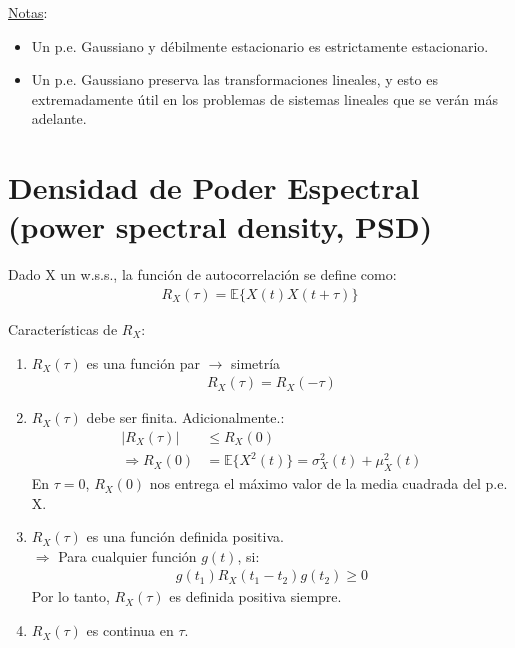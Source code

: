 \underline{Notas}:
\begin{itemize}
    \item Un p.e. Gaussiano y débilmente estacionario es estrictamente estacionario.
    \item Un p.e. Gaussiano preserva las transformaciones lineales, y esto es extremadamente útil en los problemas de sistemas lineales que se verán más adelante.
\end{itemize}





\section{Densidad de Poder Espectral (power spectral density, PSD)}
Dado X un w.s.s., la función de autocorrelación se define como:
\begin{align*}
    R_X(\tau)=\mathbb{E}\{X(t)X(t+\tau)\}
\end{align*}

Características de $R_X$:
\begin{enumerate}
    \item $R_X(\tau)$ es una función par $\longrightarrow$ simetría
    \begin{align*}
        R_X(\tau)=R_X(-\tau)
    \end{align*}
    \item $R_X(\tau)$ debe ser finita. Adicionalmente.:
    \begin{align*}
        |R_X(\tau)|&\leq R_X(0)\\
        \Longrightarrow R_X(0)&=\mathbb{E}\{X^2(t)\}=\sigma^2_X(t)+\mu_X^2(t)
    \end{align*}
    En $\tau=0$, $R_X(0)$ nos entrega el máximo valor de la media cuadrada del p.e. X.
    \item $R_X(\tau)$ es una función definida positiva.\\
    $\Longrightarrow$ Para cualquier función $g(t)$, si:
    \begin{align*}
        g(t_1)R_X(t_1-t_2)g(t_2)\geq 0
    \end{align*}
    Por lo tanto, $R_X(\tau)$ es definida positiva siempre.
    \item $R_X(\tau)$ es continua en $\tau$.
\end{enumerate}

